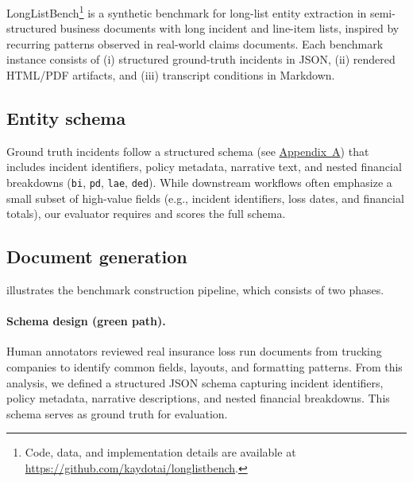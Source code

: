 LongListBench\footnote{Code, data, and implementation details are available at \url{https://github.com/kaydotai/longlistbench}.} is a synthetic benchmark for long-list entity extraction in semi-structured business documents with long incident and line-item lists, inspired by recurring patterns observed in real-world claims documents. Each benchmark instance consists of (i) structured ground-truth incidents in JSON, (ii) rendered HTML/PDF artifacts, and (iii) transcript conditions in Markdown.

\subsection{Entity schema}
Ground truth incidents follow a structured schema (see \hyperref[sec:appendix-schemas]{Appendix~A}) that includes incident identifiers, policy metadata, narrative text, and nested financial breakdowns (\texttt{bi}, \texttt{pd}, \texttt{lae}, \texttt{ded}). While downstream workflows often emphasize a small subset of high-value fields (e.g., incident identifiers, loss dates, and financial totals), our evaluator requires and scores the full schema.

\subsection{Document generation}
 illustrates the benchmark construction pipeline, which consists of two phases.

\paragraph{Schema design (green path).}
Human annotators reviewed real insurance loss run documents from trucking companies to identify common fields, layouts, and formatting patterns. From this analysis, we defined a structured JSON schema capturing incident identifiers, policy metadata, narrative descriptions, and nested financial breakdowns. This schema serves as ground truth for evaluation.

